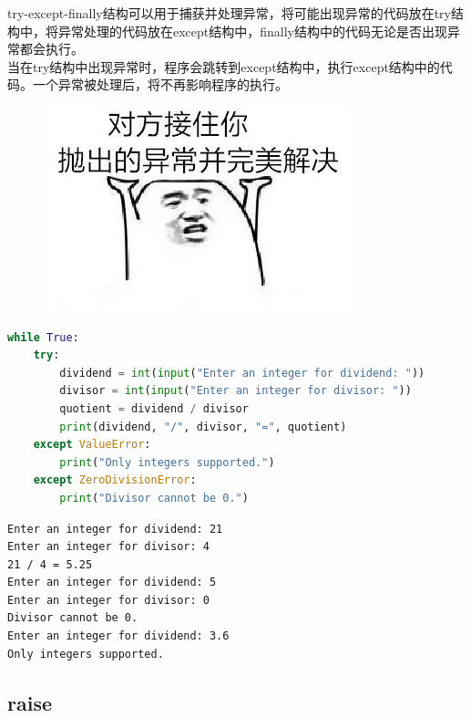 try-except-finally结构可以用于捕获并处理异常，将可能出现异常的代码放在try结构中，将异常处理的代码放在except结构中，finally结构中的代码无论是否出现异常都会执行。\\

当在try结构中出现异常时，程序会跳转到except结构中，执行except结构中的代码。一个异常被处理后，将不再影响程序的执行。\\

\begin{figure}[H]
    \centering
    \includegraphics{img/Chapter9/9-1/1.png}
\end{figure}


\begin{lstlisting}[language=Python]
while True:
    try:
        dividend = int(input("Enter an integer for dividend: "))
        divisor = int(input("Enter an integer for divisor: "))
        quotient = dividend / divisor
        print(dividend, "/", divisor, "=", quotient)
    except ValueError:
        print("Only integers supported.")
    except ZeroDivisionError:
        print("Divisor cannot be 0.")
\end{lstlisting}

\begin{tcolorbox}
    \begin{verbatim}
Enter an integer for dividend: 21
Enter an integer for divisor: 4
21 / 4 = 5.25
Enter an integer for dividend: 5
Enter an integer for divisor: 0
Divisor cannot be 0.
Enter an integer for dividend: 3.6
Only integers supported.
	\end{verbatim}
\end{tcolorbox}

\vspace{0.5cm}

\subsection{raise}

